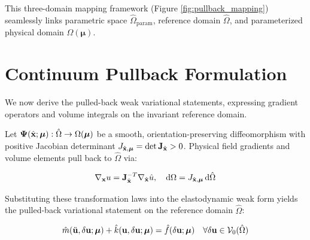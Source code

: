 This three-domain mapping framework (Figure \ref{fig:pullback_mapping}) seamlessly links parametric space $\hat{\Omega}_{\text{param}}$, reference domain $\hat{\Omega}$, and parameterized physical domain $\Omega(\boldsymbol{\mu})$.
\newpage
\section{Continuum Pullback Formulation}

We now derive the pulled-back weak variational statements, expressing gradient operators and volume integrals on the invariant reference domain.

Let $\boldsymbol{\Psi}(\hat{\mathbf{x}}; \boldsymbol{\mu}) : \hat{\Omega} \to \Omega(\boldsymbol{\mu})$ be a smooth, orientation-preserving diffeomorphism with positive Jacobian determinant $J_{\hat{\mathbf{x}}, \boldsymbol{\mu}} = \det \mathbf{J}_{\hat{\mathbf{x}}} > 0$. Physical field gradients and volume elements pull back to $\hat{\Omega}$ via:

\begin{equation}
    \nabla_{\mathbf{x}} u = \mathbf{J}_{\hat{\mathbf{x}}}^{-T} \nabla_{\hat{\mathbf{x}}} \hat{u}, \quad \mathrm{d}\Omega = J_{\hat{\mathbf{x}}, \boldsymbol{\mu}} \, \mathrm{d}\hat{\Omega}
\end{equation}

Substituting these transformation laws into the elastodynamic weak form yields the pulled-back variational statement on the reference domain $\hat{\Omega}$:

\begin{equation}
    \hat{m}(\ddot{\mathbf{u}}, \delta\mathbf{u}; \boldsymbol{\mu}) + \hat{k}(\mathbf{u}, \delta\mathbf{u}; \boldsymbol{\mu}) = \hat{f}(\delta\mathbf{u}; \boldsymbol{\mu}) \quad \forall \delta\mathbf{u} \in \mathcal{V}_0(\hat{\Omega})
\end{equation}


